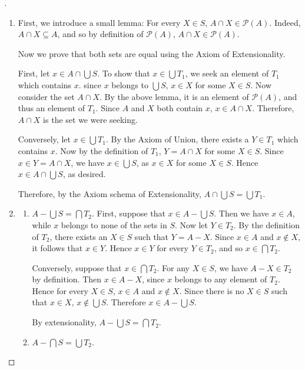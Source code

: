 \documentclass[a4paper,11pt]{article}
\theoremstyle{definition}
\newenvironment{proofbreak}[1][\proofname]{%
  \begin{proof}[#1]$ $\par\nobreak\ignorespaces
}{%
  \end{proof}
}
\begin{document}
\begin{proofbreak}
  \begin{enumerate}
  \item First, we introduce a small lemma: For every \(X \in S\),
    \(A \cap X \in \mathcal{P}(A)\). Indeed, \(A \cap X \subseteq A\), and so by definition of
    \(\mathcal{P}(A)\), \(A \cap X \in \mathcal{P}(A)\).

    Now we prove that both sets are equal using the Axiom of Extensionality.

    First, let \(x \in A \cap \bigcup S\). To show that \(x \in \bigcup T_1\), we seek an element of \(T_1\)
    which contains \(x\). since \(x\) belongs to \(\bigcup S\), \(x \in X\) for some \(X \in S\).
    Now consider the set \(A \cap X\). By the above lemma, it is an element of
    \(\mathcal{P}(A)\), and thus an element of \(T_1\).
    Since \(A\) and \(X\) both contain \(x\), \(x \in A \cap X\). Therefore, \(A \cap X\)
    is the set we were seeking.

    Conversely, let \(x \in \bigcup T_1\). By the Axiom of Union, there exists a \(Y \in T_1\)
    which contains \(x\). Now by the definition of \(T_1\), \(Y = A \cap X\) for some \(X \in S\).
    Since \(x \in Y = A \cap X\), we have \(x \in \bigcup S\), as \(x \in X\) for some \(X \in S\).
    Hence \(x \in A \cap \bigcup S\), as desired.

    Therefore, by the Axiom schema of Extensionality, \(A \cap \bigcup S = \bigcup T_1\).
  \item
    \begin{enumerate}
    \item \(A - \bigcup S = \bigcap T_2\). First, suppose that
      \(x \in A - \bigcup S\). Then we have \(x \in A\), while \(x\) belongs to none of
      the sets in \(S\). Now let \(Y \in T_2\). By the definition of \(T_2\),
      there exists an \(X \in S\) such that \(Y = A - X\). Since \(x \in A\) and
      \(x \notin X\), it follows that \(x \in Y\). Hence \(x \in Y\) for every
      \(Y \in T_2\), and so \(x \in \bigcap T_2\).

      Conversely, suppose that \(x \in \bigcap T_2\). For any \(X \in S\), we have \(A - X \in T_2\)
      by definition. Then \(x \in A - X\), since \(x\) belongs to any element of \(T_2\).
      Hence for every \(X \in S\), \(x \in A\) and \(x \notin X\). Since
      there is no \(X \in S\) such that \(x \in X\), \(x \notin \bigcup S\).
      Therefore \(x \in A - \bigcup S\).

      By extensionality, \(A - \bigcup S = \bigcap T_2\).
    \item \(A - \bigcap S = \bigcup T_2\).
    \end{enumerate}
  \end{enumerate}
\end{proofbreak}
\end{document}
